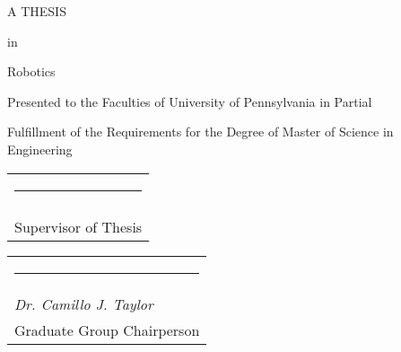 \newcommand{\namesig}[3][6cm]{%

  \singlespacing 
  \begin{tabular}{@{}p{#1}@{}}
    \\[2\normalbaselineskip] \hrule \\[0pt]
    {\textit{#2}} \\[0pt]
    {#3}
  \end{tabular}
}


\begin{titlepage}


\begin{center}
	\vspace*{2\baselineskip}
	\doublespacing
	{\LARGE \thetitle} \par
	\singlespacing
	\vspace{2\baselineskip}
	{\LARGE \theauthor} \par
	\vspace{2.2\baselineskip}
	{A THESIS} \par
	\vspace{2\baselineskip}
	{in} \par
	\vspace{2\baselineskip}
	{\LARGE Robotics} \par
	\vspace{2\baselineskip}
	{Presented to the Faculties of University of Pennsylvania in Partial} \par
	\vspace{0.8\baselineskip}
	{Fulfillment of the Requirements for the Degree of Master of Science in Engineering} \par		
	\vspace{2\baselineskip}
	{\theyear} \par	
	\vspace{1\baselineskip}
\end{center}

\namesig{\theadvisor}{Supervisor of Thesis}
\namesig{Dr. Camillo J. Taylor}{Graduate Group Chairperson}

\end{titlepage}
